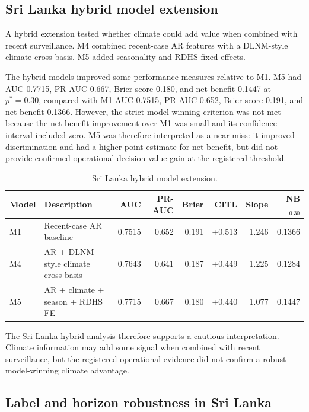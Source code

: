\documentclass[11pt,a4paper]{article}
\begin{document}
\subsection{Sri Lanka hybrid model extension}
\label{subsec:srilanka-hybrid}

A hybrid extension tested whether climate could add value when combined with recent surveillance. M4 combined recent-case AR features with a DLNM-style climate cross-basis. M5 added seasonality and RDHS fixed effects.

The hybrid models improved some performance measures relative to M1. M5 had AUC 0.7715, PR-AUC 0.667, Brier score 0.180, and net benefit 0.1447 at $p^*=0.30$, compared with M1 AUC 0.7515, PR-AUC 0.652, Brier score 0.191, and net benefit 0.1366. However, the strict model-winning criterion was not met because the net-benefit improvement over M1 was small and its confidence interval included zero. M5 was therefore interpreted as a near-miss: it improved discrimination and had a higher point estimate for net benefit, but did not provide confirmed operational decision-value gain at the registered threshold.

\begin{table}[htbp]
\centering
\caption{Sri Lanka hybrid model extension.}
\label{tab:srilanka-hybrid}
\small
\begin{tabular}{llrrrrrr}
\toprule
Model & Description & AUC & PR-AUC & Brier & CITL & Slope & NB$_{0.30}$ \\
\midrule
M1 & Recent-case AR baseline & 0.7515 & 0.652 & 0.191 & +0.513 & 1.246 & 0.1366 \\
M4 & AR + DLNM-style climate cross-basis & 0.7643 & 0.641 & 0.187 & +0.449 & 1.225 & 0.1284 \\
M5 & AR + climate + season + RDHS FE & 0.7715 & 0.667 & 0.180 & +0.440 & 1.077 & 0.1447 \\
\bottomrule
\end{tabular}
\end{table}

The Sri Lanka hybrid analysis therefore supports a cautious interpretation. Climate information may add some signal when combined with recent surveillance, but the registered operational evidence did not confirm a robust model-winning climate advantage.

\subsection{Label and horizon robustness in Sri Lanka}
\label{subsec:srilanka-label-horizon}
\end{document}

